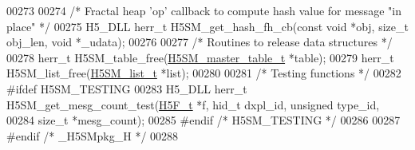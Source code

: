 \begin{DoxyCode}
00273 
00274 \textcolor{comment}{/* Fractal heap 'op' callback to compute hash value for message "in place" */}
00275 H5\_DLL herr\_t H5SM\_get\_hash\_fh\_cb(\textcolor{keyword}{const} \textcolor{keywordtype}{void} *obj, \textcolor{keywordtype}{size\_t} obj\_len, \textcolor{keywordtype}{void} *\_udata);
00276 
00277 \textcolor{comment}{/* Routines to release data structures */}
00278 herr\_t H5SM\_table\_free(\hyperlink{struct_h5_s_m__master__table__t}{H5SM\_master\_table\_t} *table);
00279 herr\_t H5SM\_list\_free(\hyperlink{struct_h5_s_m__list__t}{H5SM\_list\_t} *list);
00280 
00281 \textcolor{comment}{/* Testing functions */}
00282 \textcolor{preprocessor}{#ifdef H5SM\_TESTING}
00283 H5\_DLL herr\_t H5SM\_get\_mesg\_count\_test(\hyperlink{struct_h5_f__t}{H5F\_t} *f, hid\_t dxpl\_id, \textcolor{keywordtype}{unsigned} type\_id,
00284     \textcolor{keywordtype}{size\_t} *mesg\_count);
00285 \textcolor{preprocessor}{#endif }\textcolor{comment}{/* H5SM\_TESTING */}\textcolor{preprocessor}{}
00286 
00287 \textcolor{preprocessor}{#endif }\textcolor{comment}{/* \_H5SMpkg\_H */}\textcolor{preprocessor}{}
00288 
\end{DoxyCode}
